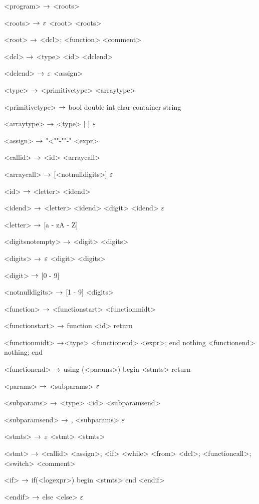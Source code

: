 \begin{grammar}
<program> $\rightarrow$ <roots>

<roots> $\rightarrow$ $\varepsilon$
\alt <root> <roots>

<root> $\rightarrow$ <dcl>;
\alt <function>
\alt <comment>

<dcl> $\rightarrow$ <type> <id> <dclend>

<dclend> $\rightarrow$ $\varepsilon$
\alt <assign> 

<type> $\rightarrow$ <primitivetype> <arraytype>

<primitivetype> $\rightarrow$ bool
\alt double
\alt int
\alt char
\alt container
\alt string

<arraytype> $\rightarrow$ <type> [ ]
\alt $\varepsilon$


<assign>  $\rightarrow$ "<""-""-" <expr>

<callid> $\rightarrow$ <id> <arraycall>

<arraycall> $\rightarrow$ [<notnulldigits>]
\alt $\varepsilon$

<id> $\rightarrow$ <letter> <idend>

<idend> $\rightarrow$ <letter> <idend>
	\alt <digit> <idend>
	\alt $\varepsilon$

<letter> $\rightarrow$ [a - zA - Z]

<digitsnotempty> $\rightarrow$ <digit> <digits>

<digits> $\rightarrow$ $\varepsilon$
\alt <digit> <digits>

<digit> $\rightarrow$ [0 - 9]

<notnulldigits> $\rightarrow$ [1 - 9] <digits>

<function> $\rightarrow$  <functionstart> <functionmidt>

<functionstart> $\rightarrow$ function <id> return

<functionmidt> $\rightarrow$<type> <functionend> <expr>; end
\alt nothing <functionend> nothing; end

<functionend> $\rightarrow$
using (<params>)
begin
	<stmts>
	return

<params> $\rightarrow$ <subparams>
	\alt $\varepsilon$

<subparams> $\rightarrow$ <type> <id> <subparamsend>

<subparamsend> $\rightarrow$ , <subparams>
\alt $\varepsilon$

<stmts> $\rightarrow$ $\varepsilon$
	\alt <stmt> <stmts>

<stmt> $\rightarrow$ <callid> <assign>;
	\alt <if>
	\alt <while>
	\alt <from>
	\alt <dcl>;
	\alt <functioncall>;
	\alt <switch>
	\alt <comment>
	
<if> $\rightarrow$ if(<logexpr>)
	begin
		<stmts>
	end
	<endif>

<endif> $\rightarrow$ 
	else <else>
	\alt $\varepsilon$


\end{grammar}
